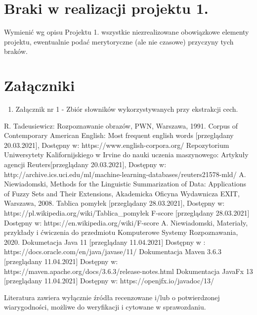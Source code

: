 \documentclass{classrep}
\begin{document}
\section{Braki w realizacji projektu 1.}
Wymienić wg opisu Projektu 1. wszystkie niezrealizowane obowiązkowe elementy projektu, ewentualnie
podać merytoryczne (ale nie czasowe) przyczyny tych braków. 

\section*{Załączniki}
\begin{enumerate}
   \item Załącznik nr 1 - Zbiór słowników wykorzystywanych przy ekstrakcji cech.
\end{enumerate}

\begin{thebibliography}{0}
 R. Tadeusiewicz: Rozpoznawanie obrazów, PWN, Warszawa, 1991.  
 Corpus of Contemporary American English: Most frequent english words [przeglądany  20.03.2021], Dostępny w: https://www.english-corpora.org/
 Repozytorium Uniwersytety Kalifornijskiego w Irvine do nauki uczenia maszynowego: Artykuły agencji Reuters[przeglądany 20.03.2021], 
Dostępny w: http://archive.ics.uci.edu/ml/machine-learning-databases/reuters21578-mld/
 A. Niewiadomski, Methods for the Linguistic Summarization of Data: Applications of Fuzzy Sets and Their Extensions, Akademicka Oficyna Wydawnicza EXIT, Warszawa, 2008.
 Tablica pomyłek [przeglądany 28.03.2021], Dostępny w: https://pl.wikipedia.org/wiki/Tablica\_pomyłek
 F-score [przeglądany 28.03.2021] Dostępny w: https://en.wikipedia.org/wiki/F-score
 A. Niewiadomski, Materiały, przykłady i ćwiczenia do przedmiotu Komputerowe Systemy Rozpoznawania, 2020.
 Dokumetacja Java 11 [przeglądany 11.04.2021] Dostępny w : https://docs.oracle.com/en/java/javase/11/
 Dokumentacja Maven 3.6.3 [przeglądany 11.04.2021] Dostępny w: https://maven.apache.org/docs/3.6.3/release-notes.html
 Dokumentacja JavaFx 13 [przeglądany 11.04.2021] Dostępny w: https://openjfx.io/javadoc/13/ 
\end{thebibliography}

Literatura zawiera wyłącznie źródła recenzowane i/lub o potwierdzonej wiarygodności,
możliwe do weryfikacji i cytowane w sprawozdaniu. 
\end{document}
